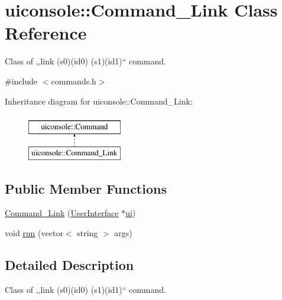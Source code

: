 \hypertarget{classuiconsole_1_1Command__Link}{
\section{uiconsole::Command\_\-Link Class Reference}
\label{d3/d25/classuiconsole_1_1Command__Link}
}


Class of ,,link (s0)(id0) (s1)(id1)`` command.  




{\ttfamily \#include $<$commands.h$>$}

Inheritance diagram for uiconsole::Command\_\-Link:\begin{figure}[H]
\begin{center}
\leavevmode
\includegraphics[height=2.000000cm]{d3/d25/classuiconsole_1_1Command__Link}
\end{center}
\end{figure}
\subsection*{Public Member Functions}
\begin{DoxyCompactItemize}
\item 
\hyperlink{classuiconsole_1_1Command__Link_a9ec2d337ea91b840a0d67d21948d436e}{Command\_\-Link} (\hyperlink{classUserInterface}{UserInterface} $\ast$\hyperlink{classuiconsole_1_1Command_ab43ed5152860c099f858d62f9f556699}{ui})
\item 
void \hyperlink{classuiconsole_1_1Command__Link_a62fc45d4a5aa32b6d2e685f055cec0e6}{run} (vector$<$ string $>$ args)
\end{DoxyCompactItemize}


\subsection{Detailed Description}
Class of ,,link (s0)(id0) (s1)(id1)`` command. 

